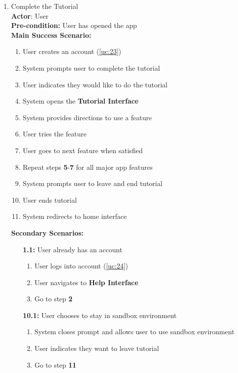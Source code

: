 \documentclass{article}
\begin{document}
\begin{enumerate}[label=\textbf{UC\arabic*}]
    \item \label{uc:1} Complete the Tutorial \\
    \textbf{Actor}: User \\
    \textbf{Pre-condition:} User has opened the app \\

    \textbf{Main Success Scenario:}
    \begin{enumerate}[label=\textbf{\arabic*.}]
        \item User creates an account (\ref{uc:23})
        \item System prompts user to complete the tutorial
        \item User indicates they would like to do the tutorial
        \item System opens the \textbf{Tutorial Interface}
        \item System provides directions to use a feature
        \item User tries the feature
        \item User goes to next feature when satisfied
        \item Repeat steps \textbf{5}-\textbf{7} for all major app features
        \item System prompts user to leave and end tutorial
        \item User ends tutorial
        \item System redirects to home interface
    \end{enumerate}

    \textbf{Secondary Scenarios:} 
    \begin{itemize}
        \item[{\bf 1.1:}] User already has an account
        \begin{enumerate}[label=\textbf{\arabic*.}]
            \item User logs into account (\ref{uc:24})
            \item User navigates to \textbf{Help Interface}
            \item Go to step \textbf{2}
        \end{enumerate}
        \item[{\bf 10.1:}] User chooses to stay in sandbox environment
        \begin{enumerate}[label=\textbf{\arabic*.}]
            \item System closes prompt and allows user to use sandbox environment
            \item User indicates they want to leave tutorial
            \item Go to step \textbf{11}
        \end{enumerate}
    \end{itemize}
\end{enumerate}
\end{document}
